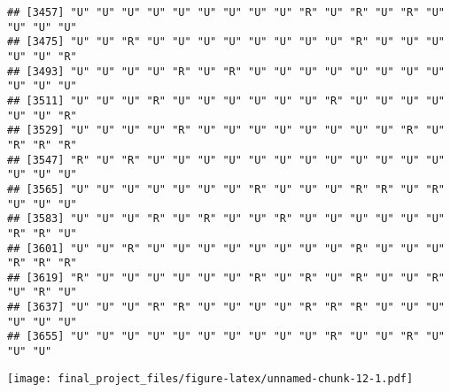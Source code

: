 \documentclass[
]{article}
\newenvironment{Shaded}{\begin{snugshade}}{\end{snugshade}}
\newcommand{\AttributeTok}[1]{\textcolor[rgb]{0.77,0.63,0.00}{#1}}
\newcommand{\FunctionTok}[1]{\textcolor[rgb]{0.00,0.00,0.00}{#1}}
\newcommand{\NormalTok}[1]{#1}
\newcommand{\SpecialCharTok}[1]{\textcolor[rgb]{0.00,0.00,0.00}{#1}}
\newcommand{\StringTok}[1]{\textcolor[rgb]{0.31,0.60,0.02}{#1}}
\begin{document}
\begin{verbatim}
## [3457] "U" "U" "U" "U" "U" "U" "U" "U" "U" "R" "U" "R" "U" "R" "U" "U" "U" "U"
## [3475] "U" "U" "R" "U" "U" "U" "U" "U" "U" "U" "U" "R" "U" "U" "U" "U" "U" "R"
## [3493] "U" "U" "U" "U" "R" "U" "R" "U" "U" "U" "U" "U" "U" "U" "U" "U" "U" "U"
## [3511] "U" "U" "U" "R" "U" "U" "U" "U" "U" "U" "R" "U" "U" "U" "U" "U" "U" "R"
## [3529] "U" "U" "U" "U" "R" "U" "U" "U" "U" "U" "U" "U" "U" "R" "U" "R" "R" "R"
## [3547] "R" "U" "R" "U" "U" "U" "U" "U" "U" "U" "U" "U" "U" "U" "U" "U" "U" "U"
## [3565] "U" "U" "U" "U" "U" "U" "U" "R" "U" "U" "U" "R" "R" "U" "R" "U" "U" "U"
## [3583] "U" "U" "U" "R" "U" "R" "U" "U" "R" "U" "U" "U" "U" "U" "U" "R" "R" "U"
## [3601] "U" "U" "R" "U" "U" "U" "U" "U" "U" "U" "U" "R" "U" "U" "U" "R" "R" "R"
## [3619] "R" "U" "U" "U" "U" "U" "U" "R" "U" "R" "U" "R" "U" "U" "R" "U" "R" "U"
## [3637] "U" "U" "U" "R" "R" "U" "U" "U" "U" "R" "R" "R" "U" "U" "U" "U" "U" "U"
## [3655] "U" "U" "U" "U" "U" "U" "U" "U" "U" "U" "R" "U" "U" "R" "U" "U" "U"
\end{verbatim}

\begin{Shaded}
\end{Shaded}

\texttt{[image: final\_project\_files/figure-latex/unnamed-chunk-12-1.pdf]}
\end{document}
